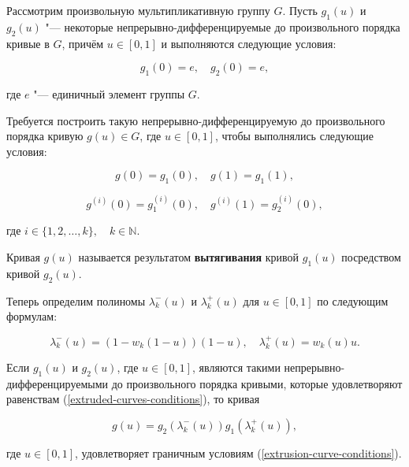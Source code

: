 Рассмотрим произвольную мультипликативную группу $G$. Пусть $g_1(u)$ и $g_2(u)$ "--- некоторые
непрерывно-дифференцируемые до произвольного порядка кривые в $G$, причём $u \in [0,1]$ и выполняются следующие условия:

\begin{equation}
g_1(0)=e, \quad g_2(0)=e,
\label{extruded-curves-conditions}
\end{equation}

\noindent где $e$ "--- единичный элемент группы $G$.

Требуется построить такую непрерывно-дифференцируемую до произвольного порядка кривую $g(u)\in G$, где $u \in [0,1]$,
чтобы выполнялись следующие условия:

$$
g(0)=g_1(0), \quad g(1)=g_1(1),
$$

\begin{equation}
g^{(i)}(0)=g_1^{(i)}(0), \quad g^{(i)}(1)=g_2^{(i)}(0),
\label{extrusion-curve-conditions}
\end{equation}

\noindent где $i \in \{1,2,\dots,k\},\quad k\in\mathbb{N}$.

\begin{definition}
Кривая $g(u)$ называется результатом \textbf{вытягивания} кривой $g_1(u)$ посредством кривой $g_2(u)$.
\end{definition}

Теперь определим полиномы $\lambda_k^-(u)$ и $\lambda_k^+(u)$ для $u \in [0,1]$ по следующим формулам:

$$
\lambda_k^-(u)=(1-w_k(1-u))(1-u), \quad \lambda_k^+(u)=w_k(u)u.
$$

\begin{theorem}
Если $g_1(u)$ и $g_2(u)$, где $u \in [0,1]$, являются такими непрерывно-дифференцируемыми до произвольного порядка
кривыми, которые удовлетворяют равенствам (\ref{extruded-curves-conditions}), то кривая

$$
g(u)=g_2(\lambda_k^-(u))g_1(\lambda_k^+(u)),
$$

\noindent где $u \in [0,1]$, удовлетворяет граничным условиям (\ref{extrusion-curve-conditions}).
\end{theorem}
